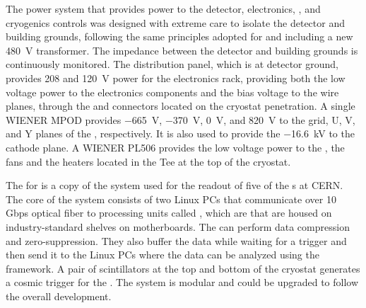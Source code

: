 The  power system that provides power to the detector, electronics, 
, and cryogenics controls was designed with extreme care to 
isolate the detector and building grounds, following the same principles adopted
for  and including a new \SI{480}{V} transformer. The impedance between the detector
and building grounds is continuously monitored. The distribution panel, which is 
at detector ground, provides 208 and \SI{120}{V} power for the  electronics rack, 
providing both the low voltage power to the  electronics components and the bias 
voltage to the  wire planes, through the  and 
connectors located on the cryostat penetration. A single WIENER MPOD provides 
\SI{-665}{V}, \SI{-370}{V}, \SI{0}{V}, and \SI{820}{V} to the grid, U, V, and 
Y planes of the , respectively. It is also used to provide the 
\SI{-16.6}{kV} to the cathode plane. A WIENER PL506 provides the low voltage
power to the , the fans and the heaters located in the 
Tee at the top of the cryostat. 

The  for  is a copy of the system used for the readout
of five of the  s at CERN. The core of the  system 
consists of two Linux PCs that communicate over 10 Gbps optical fiber
to processing units called , which are  that are
housed on industry-standard  shelves on  motherboards.
The  can perform data compression and zero-suppression. They also buffer
the data while waiting for a trigger and then send it to the Linux PCs where the data can
be analyzed using the  framework. A pair of scintillators at the top and
bottom of the cryostat generates a cosmic trigger for the .
The system is modular and could be upgraded to follow the overall   
development. 


